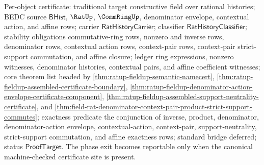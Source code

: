 Per-object certificate: traditional target constructive field over rational
histories; BEDC source $\mathsf{BHist}$, $\RatUp$, $\CommRingUp$, denominator
envelope, contextual action, and affine rows; carrier
$\mathsf{RatHistoryCarrier}$; classifier $\mathsf{RatHistoryClassifier}$;
stability obligations commutative-ring rows, nonzero and inverse rows,
denominator rows, contextual action rows, context-pair rows,
context-pair strict-support commutation, and affine closure; ledger ring
expressions, nonzero witnesses, denominator histories, contextual pairs, and
affine coefficient witnesses; core theorem list headed by
\autoref{thm:ratup-fieldup-semantic-namecert},
\autoref{thm:ratup-fieldup-assembled-certificate-boundary},
\autoref{thm:ratup-fieldup-denominator-action-envelope-certificate-component},
\autoref{thm:ratup-fieldup-assembled-support-neutrality-certificate},
and
\autoref{thm:field-rat-denominator-context-pair-product-strict-support-commutes};
exactness predicate the conjunction of inverse, product, denominator,
denominator-action envelope, contextual-action, context-pair,
support-neutrality, strict-support commutation, and affine exactness rows;
standard bridge deferred; status $\mathsf{ProofTarget}$.
The phase exit becomes reportable only when the canonical machine-checked
certificate site is present.

